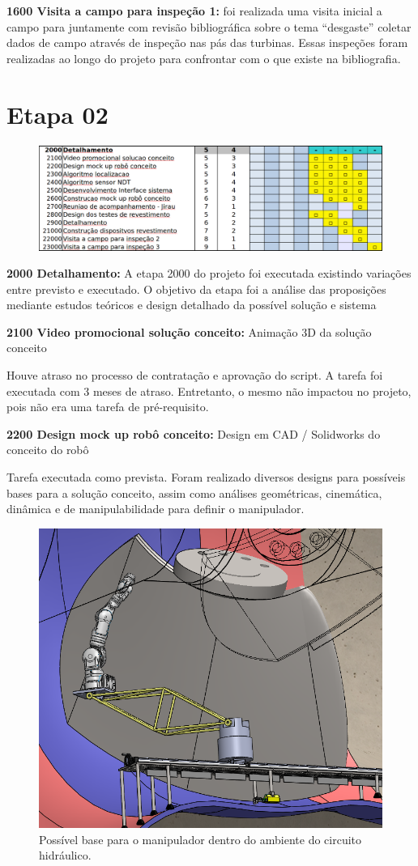 \noindent
\textbf{1600 Visita a campo para inspeção 1:} foi realizada uma visita inicial
a campo para juntamente com revisão bibliográfica sobre o tema “desgaste”
coletar dados de campo através de inspeção nas pás das turbinas. Essas inspeções
foram realizadas ao longo do projeto para confrontar com o que existe na
bibliografia.


\section{Etapa 02}

\begin{figure}[H]
\centering
\includegraphics[width=0.9\columnwidth]{figs/etapa2_completo}
\end{figure} 

\noindent
\textbf{2000 Detalhamento:} A etapa 2000 do projeto foi executada existindo
variações entre previsto e executado. O objetivo da etapa foi a análise das
proposições mediante estudos teóricos e design detalhado da possível solução e sistema

\noindent
\textbf{2100 Video promocional solução conceito:} Animação 3D da solução
conceito

Houve atraso no processo de contratação e aprovação do script. A tarefa foi
executada com 3 meses de atraso. Entretanto, o mesmo não impactou no projeto,
pois não era uma tarefa de pré-requisito.

\noindent
\textbf{2200 Design mock up robô conceito:} Design em CAD / Solidworks do
conceito do robô

Tarefa executada como prevista. Foram realizado diversos designs para possíveis
bases para a solução conceito, assim como análises geométricas, cinemática,
dinâmica e de manipulabilidade para definir o manipulador.

\begin{figure}\centering
\includegraphics[width=0.6\columnwidth]{figs/EMMA_Base_Conceito_PRR}
\caption{Possível base para o manipulador dentro do ambiente do circuito
hidráulico.}
\end{figure} 


